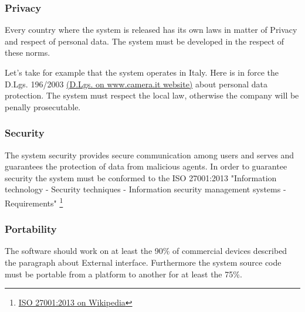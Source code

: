 \documentclass[english]{article}
\begin{document}
		\subsubsection{Privacy}
		Every country where the system is released has its own laws in matter of Privacy and respect of personal data. The system must be developed in the respect of these norms.\par Let's take for example that the system operates in Italy. Here is in force the D.Lgs. 196/2003 \href{http://www.camera.it/parlam/leggi/deleghe/03196dl.htm}{(D.Lgs. on www.camera.it website)} about personal data protection. The system must respect the local law, otherwise the company will be penally prosecutable.
		\subsubsection{Security}
		The system security provides secure communication among users and serves and guarantees the protection of data from malicious agents. In order to guarantee security the system must be conformed to the ISO 27001:2013 "Information technology - Security techniques - Information security management systems - Requirements" \footnote{\href{https://en.wikipedia.org/wiki/ISO/IEC_27001:2013}{ISO 27001:2013 on Wikipedia}}
		\subsubsection{Portability}
		The software should work on at least the 90\% of commercial devices described the paragraph about External interface. Furthermore the system source code must be portable from a platform to another for at least the 75\%.		
		
\end{document}
